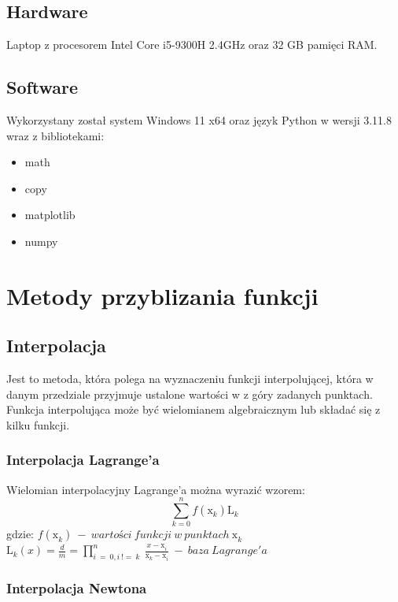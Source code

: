 \documentclass{article}
\begin{document}
\subsection{Hardware}

Laptop z procesorem Intel Core i5-9300H 2.4GHz oraz 32 GB pamięci RAM.

\subsection{Software}

Wykorzystany został system Windows 11 x64 oraz język Python w wersji 3.11.8 wraz z bibliotekami:
\begin{itemize}
\item math
\item copy
\item matplotlib
\item numpy
\end{itemize}

\newpage

\section{Metody przyblizania funkcji}

\subsection{Interpolacja}

Jest to metoda, która polega na wyznaczeniu funkcji interpolującej, która w danym przedziale przyjmuje ustalone wartości w z góry zadanych punktach. Funkcja interpolująca może być wielomianem algebraicznym lub składać się z kilku funkcji.

\subsubsection{Interpolacja Lagrange'a}

Wielomian interpolacyjny Lagrange'a można wyrazić wzorem:
\[\sum_{k=0}^{n} f(\mathrm{x}_{k}^{})\mathrm{L}_{k}^{}\]
gdzie:
\bigbreak
\( f(\mathrm{x}_{k}^{})\ -\ wartości\ funkcji\ w\ punktach\ \mathrm{x}_{k}^{} \)
\bigbreak
\( \mathrm{L}_{k}^{}(x) = \frac{d}{m} = \prod_{i\ =\ 0, i\ !=\ k}^{n}\ \frac{x -\mathrm{x}_{i}^{}}{\mathrm{x}_{k}^{} - \mathrm{x}_{i}^{}}\ - \ baza\ Lagrange'a\)

\subsubsection{Interpolacja Newtona}
\end{document}
